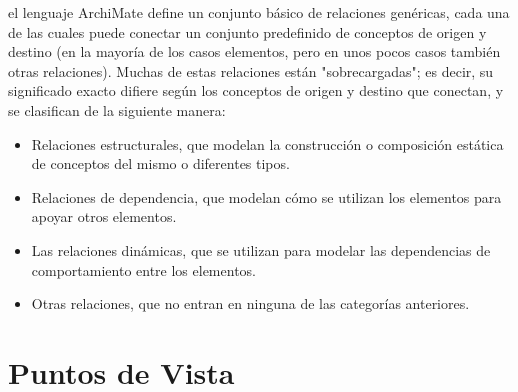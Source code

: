 el lenguaje ArchiMate define un conjunto básico de relaciones genéricas, cada una de las cuales puede conectar un conjunto predefinido de conceptos de origen y destino (en la mayoría de los casos elementos, pero en unos pocos casos también otras relaciones).  Muchas de estas relaciones están "sobrecargadas"; es decir, su significado exacto difiere según los conceptos de origen y destino que conectan, y se clasifican de la siguiente manera:
\begin{itemize}
	\item Relaciones estructurales, que modelan la construcción o composición estática de conceptos del mismo o diferentes tipos.
	\item Relaciones de dependencia, que modelan cómo se utilizan los elementos para apoyar otros elementos.
	\item Las relaciones dinámicas, que se utilizan para modelar las dependencias de comportamiento entre los elementos.
	\item Otras relaciones, que no entran en ninguna de las categorías anteriores.
\end{itemize}









\section{Puntos de Vista}











%